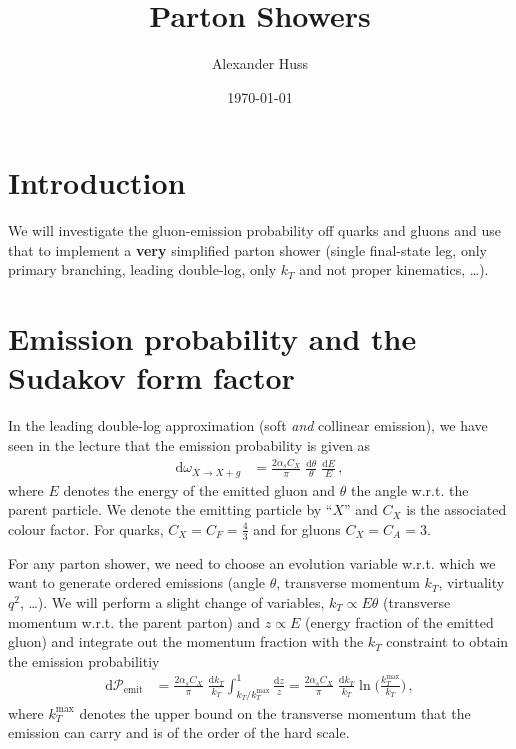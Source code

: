 \documentclass[11pt]{article}
\author{Alexander Huss}
\date{\today}
\title{Parton Showers}
\begin{document}
\maketitle
\tableofcontents



\section{Introduction}
\label{sec:orgc65571d}
We will investigate the gluon-emission probability off quarks and gluons and use that to implement a \textbf{very} simplified parton shower (single final-state leg, only primary branching, leading double-log, only \(k_T\) and not proper kinematics, \ldots{}).

\section{Emission probability and the Sudakov form factor}
\label{sec:orgf14f55e}
In the leading double-log approximation (soft \emph{and} collinear emission), we have seen in the lecture that the emission probability is given as
\begin{align}
  \mathrm{d}\omega_{X\to X+g}
  &=
  \frac{2\alpha_s C_X}{\pi} \; \frac{\mathrm{d}\theta}{\theta} \; \frac{\mathrm{d}E}{E}
  \,,
\end{align}
where \(E\) denotes the energy of the emitted gluon and \(\theta\) the angle w.r.t. the parent particle.
We denote the emitting particle by ``\(X\)'' and \(C_X\) is the associated colour factor.
For quarks, \(C_X=C_F=\tfrac{4}{3}\) and for gluons \(C_X=C_A=3\).

For any parton shower, we need to choose an evolution variable w.r.t. which we want to generate ordered emissions (angle \(\theta\), transverse momentum \(k_T\), virtuality \(q^2\), \ldots{}).
We will perform a slight change of variables, \(k_T \propto E \theta\) (transverse momentum w.r.t. the parent parton) and \(z \propto E\) (energy fraction of the emitted gluon) and integrate out the momentum fraction with the \(k_T\) constraint to obtain the emission probabilitiy
\begin{align}
  \mathrm{d}\mathcal{P}_\text{emit}
  &=
  \frac{2\alpha_s C_X}{\pi} \; \frac{\mathrm{d}k_T}{k_T} \int_{k_T/k_T^\mathrm{max}}^1 \frac{\mathrm{d}z}{z}
  =
  \frac{2\alpha_s C_X}{\pi} \; \frac{\mathrm{d}k_T}{k_T} \ln\biggl(\frac{k_T^\mathrm{max}}{k_T}\biggr)
  \,,
\end{align}
where \(k_T^\mathrm{max}\) denotes the upper bound on the transverse momentum that the emission can carry and is of the order of the hard scale.
\end{document}
